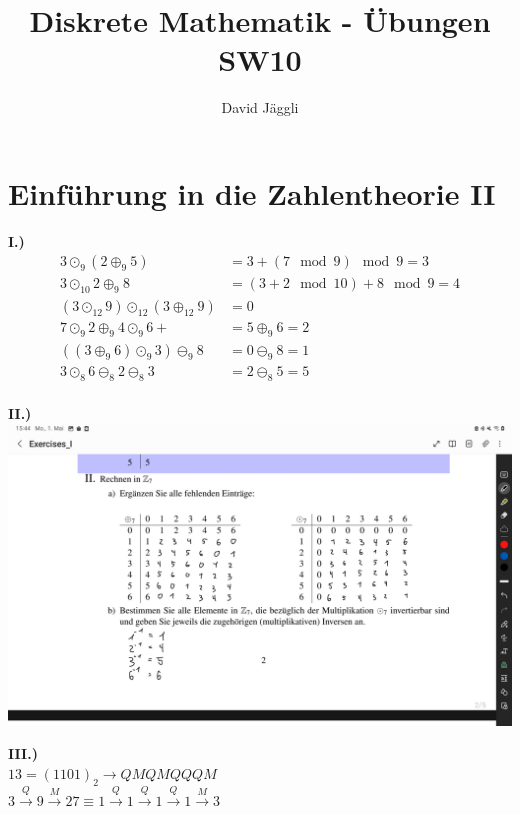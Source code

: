 \documentclass[12pt]{scrartcl}
\author{David Jäggli}
\title{Diskrete Mathematik - Übungen SW10}
\begin{document}
\maketitle

\tableofcontents

\newpage
\section{Einführung in die Zahlentheorie II}
\textbf{I.)}\\

\begin{align*}
    3 \odot_9 (2 \oplus_9 5)  &=  3 + (7 \mod 9) \mod 9 = 3\\
    3 \odot_10 2 \oplus_9 8 &= (3 + 2 \mod 10) + 8 \mod 9 = 4\\
    (3 \odot_{12} 9) \odot_{12} (3 \oplus_{12} 9) &= 0 \\
    7 \odot_9 2 \oplus_9 4 \odot_9 6+ &= 5 \oplus_9 6 = 2 \\
    ((3 \oplus_9 6) \odot_9 3) \ominus_9 8 &= 0 \ominus_9 8 = 1\\
    3 \odot_8 6 \ominus_8 2 \ominus_8 3 &= 2 \ominus_8 5 = 5\\
\end{align*}

\newpage
\textbf{II.)}\\
\includegraphics[width=14cm]{img/2_a_b.jpg}

\vspace{1.5cm}
\textbf{III.)}\\
$13 = (1101)_2 \rightarrow QMQMQQQM$\\

$3 \xrightarrow{Q} 9 \xrightarrow{M} 27 \equiv 1 \xrightarrow{Q} 1 \xrightarrow{Q} 1 \xrightarrow{Q} 1 \xrightarrow{M} 3$\\
\end{document}
